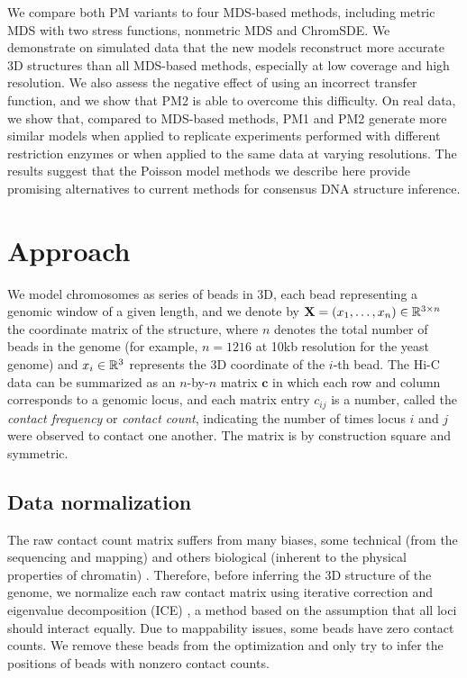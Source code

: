 We compare both PM variants to four MDS-based methods, including metric
MDS with two stress functions, nonmetric MDS and ChromSDE. We demonstrate
on simulated data that the new models reconstruct more accurate 3D structures
than all MDS-based methods, especially at low coverage and high resolution.
We also assess the negative effect of using an incorrect transfer function,
and we show that PM2 is able to overcome this difficulty. On real data, we show
that, compared to MDS-based methods, PM1 and PM2 generate more similar models
when applied to replicate experiments performed with different restriction enzymes
or when applied to the same data at varying resolutions. The results suggest that
the Poisson model methods we describe here provide promising alternatives to
current methods for consensus DNA structure inference.

\section{Approach}

We model chromosomes as series of beads in 3D, each bead representing
a genomic window of a given length, and we denote by $\textbf{X} =
(x_1,\ldots,x_n) \in \mathbb{R}^{3 \times n}$ the coordinate matrix of the
structure, where $n$ denotes the total number of beads in the genome
(for example, $n=1216$ at 10kb resolution for the yeast genome) and
$x_i\in\mathbb{R}^3$ represents the 3D coordinate of the $i$-th bead. The Hi-C
data can be summarized as an $n$-by-$n$ matrix $\mathbf{c}$ in which
each row and column corresponds to a genomic locus, and each matrix
entry $c_{ij}$ is a number, called the {\em contact frequency} or {\em
  contact count}, indicating the number of times locus $i$ and $j$
were observed to contact one another. The matrix is by construction
square and symmetric.

\subsection{Data normalization}
The raw contact count matrix suffers from many biases, some technical (from
the sequencing and mapping) and others biological (inherent to the physical
properties of chromatin) \citep{yaffe:probabilistic, imakaev:iterative}.
Therefore, before inferring the 3D structure of the genome, we normalize each
raw contact matrix using iterative correction and eigenvalue decomposition
(ICE) \citep{imakaev:iterative}, a method based on the assumption that all
loci should interact equally. Due to mappability issues, some beads have zero
contact counts. We remove these beads from the optimization and only try to
infer the positions of beads with nonzero contact counts.


